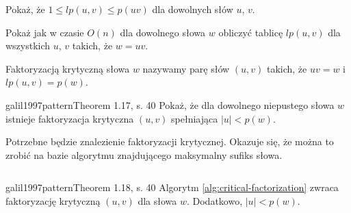 \begin{problem}{}{}
  Pokaż, że $1 \le lp(u, v) \le p(uv)$ dla dowolnych słów $u$, $v$.
\end{problem}

\begin{problem}{}{}
  Pokaż jak w czasie $O(n)$ dla dowolnego słowa $w$ obliczyć tablicę $lp(u, v)$ dla wszystkich $u$, $v$ takich, że $w = uv$.
\end{problem}

\begin{definition}{}{}
  Faktoryzacją krytyczną słowa $w$ nazywamy parę słów $(u, v)$ takich, że $uv = w$ i $lp(u, v) = p(w)$.
\end{definition}

\begin{problem}{galil1997pattern}{Theorem 1.17, s. 40}
  Pokaż, że dla dowolnego niepustego słowa $w$ istnieje faktoryzacja krytyczna $(u, v)$ spełniająca $|u| < p(w)$.
\end{problem}

Potrzebne będzie znalezienie faktoryzacji krytycznej. Okazuje się, że można to zrobić na bazie algorytmu znajdującego maksymalny sufiks słowa.

\begin{code}
\inputminted{python}{code/factorization/critical-factorization.py}
\label{alg:critical-factorization}
\end{code}

\begin{theorem}{galil1997pattern}{Theorem 1.18, s. 40}
  Algorytm \ref{alg:critical-factorization} zwraca faktoryzację krytyczną $(u, v)$ dla słowa $w$. Dodatkowo, $|u| < p(w)$.
\end{theorem}

